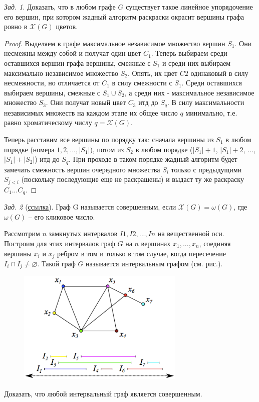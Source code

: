 \documentclass[a4paper,12pt]{article}
\numberwithin{figure}{section}
\theoremstyle{remark}
\newtheorem{problem}{Зад.}[section]
\def\iiChi{\mathcal{X}}
\begin{document}
\begin{problem}
	Доказать, что в любом графе $G$ существует такое линейное упорядочение его вершин, при котором жадный алгоритм раскраски окрасит вершины графа ровно в $\iiChi(G)$ цветов.
\end{problem}
\begin{proof}
	Выделяем в графе максимальное независимое множество вершин $S_1$. Они несмежны между собой и получат один цвет $C_1$. Теперь выбираем среди оставшихся вершин графа вершины, смежные с $S_1$ и среди них выбираем максимально независимое множество $S_2$. Опять, их цвет $C2$ одинаковый в силу несмежности, но отличается от $C_1$ в силу смежности с $S_1$. Среди оставшихся выбираем вершины, смежные с $S_1 \cup S_2$, а среди них - максимальное независимое множество $S_3$. Они получат новый цвет $C_3$ итд до $S_q$. В силу максимальности независимых множеств на каждом этапе их общее число $q$ минимально, т.е. равно хроматическому числу $q = \iiChi(G)$.
	
	Теперь расставим все вершины по порядку так: сначала вершины из $S_1$ в любом порядке (номера $1,2,...,|S_1|$), потом из $S_2$ в любом порядке ($|S_1|+1$, $|S_1|+2$, ..., $|S_1|+|S_2|$) итд до $S_q$. При проходе в таком порядке жадный алгоритм будет замечать смежность вершин очередного множества $S_i$ только с предыдущими $S_{j<i}$ (поскольку последующие еще не раскрашены) и выдаст ту же раскраску $C_1...C_q$.
\end{proof}


\begin{problem}[\href{https://stepik.org/lesson/12296/step/4}{ссылка}]

	Граф G называется совершенным, если $\iiChi(G)=\omega(G)$, где $\omega(G)$ -- его кликовое число.

	Рассмотрим $n$ замкнутых интервалов $I1,I2,...,In$ на вещественной оси. Построим для этих интервалов граф $G$ на $n$ вершинах $x_1,...,x_n$, соединяя вершины $x_i$ и $x_j$ ребром в том и только в том случае, когда пересечение $I_i \cap I_j \neq \varnothing$. Такой граф $G$ называется интервальным графом (см. рис.). 

	\begin{figure}[H]
		\centering
		\includegraphics[width=8cm]{interval-graph-coloring.png}
	\end{figure}

	Доказать, что любой интервальный граф является совершенным.
\end{problem}
\end{document}
